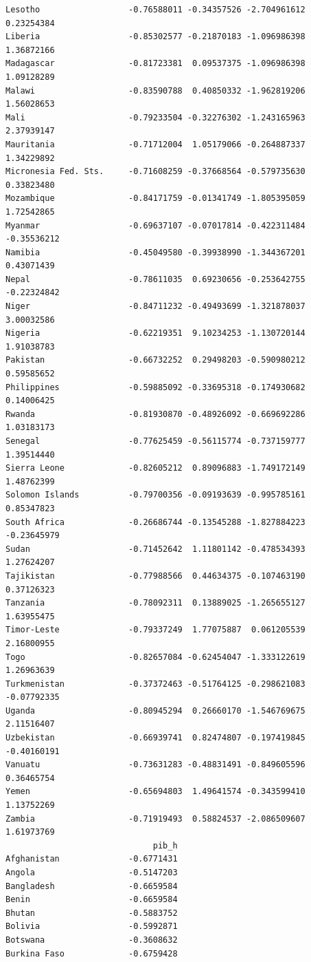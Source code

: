 \documentclass[
]{article}
\begin{document}
\begin{verbatim}
Lesotho                  -0.76588011 -0.34357526 -2.704961612  0.23254384
Liberia                  -0.85302577 -0.21870183 -1.096986398  1.36872166
Madagascar               -0.81723381  0.09537375 -1.096986398  1.09128289
Malawi                   -0.83590788  0.40850332 -1.962819206  1.56028653
Mali                     -0.79233504 -0.32276302 -1.243165963  2.37939147
Mauritania               -0.71712004  1.05179066 -0.264887337  1.34229892
Micronesia Fed. Sts.     -0.71608259 -0.37668564 -0.579735630  0.33823480
Mozambique               -0.84171759 -0.01341749 -1.805395059  1.72542865
Myanmar                  -0.69637107 -0.07017814 -0.422311484 -0.35536212
Namibia                  -0.45049580 -0.39938990 -1.344367201  0.43071439
Nepal                    -0.78611035  0.69230656 -0.253642755 -0.22324842
Niger                    -0.84711232 -0.49493699 -1.321878037  3.00032586
Nigeria                  -0.62219351  9.10234253 -1.130720144  1.91038783
Pakistan                 -0.66732252  0.29498203 -0.590980212  0.59585652
Philippines              -0.59885092 -0.33695318 -0.174930682  0.14006425
Rwanda                   -0.81930870 -0.48926092 -0.669692286  1.03183173
Senegal                  -0.77625459 -0.56115774 -0.737159777  1.39514440
Sierra Leone             -0.82605212  0.89096883 -1.749172149  1.48762399
Solomon Islands          -0.79700356 -0.09193639 -0.995785161  0.85347823
South Africa             -0.26686744 -0.13545288 -1.827884223 -0.23645979
Sudan                    -0.71452642  1.11801142 -0.478534393  1.27624207
Tajikistan               -0.77988566  0.44634375 -0.107463190  0.37126323
Tanzania                 -0.78092311  0.13889025 -1.265655127  1.63955475
Timor-Leste              -0.79337249  1.77075887  0.061205539  2.16800955
Togo                     -0.82657084 -0.62454047 -1.333122619  1.26963639
Turkmenistan             -0.37372463 -0.51764125 -0.298621083 -0.07792335
Uganda                   -0.80945294  0.26660170 -1.546769675  2.11516407
Uzbekistan               -0.66939741  0.82474807 -0.197419845 -0.40160191
Vanuatu                  -0.73631283 -0.48831491 -0.849605596  0.36465754
Yemen                    -0.65694803  1.49641574 -0.343599410  1.13752269
Zambia                   -0.71919493  0.58824537 -2.086509607  1.61973769
                              pib_h
Afghanistan              -0.6771431
Angola                   -0.5147203
Bangladesh               -0.6659584
Benin                    -0.6659584
Bhutan                   -0.5883752
Bolivia                  -0.5992871
Botswana                 -0.3608632
Burkina Faso             -0.6759428

\end{verbatim}
\end{document}

